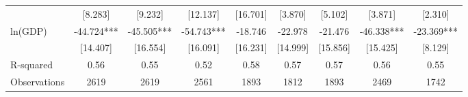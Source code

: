 \begin{table}[htbp]
{\begin{tabular}{l*{8}{c}}
                    &     [8.283]   &     [9.232]   &    [12.137]   &    [16.701]   &     [3.870]   &     [5.102]   &     [3.871]   &     [2.310]   \\
ln(GDP)             &     -44.724***&     -45.505***&     -54.743***&     -18.746   &     -22.978   &     -21.476   &     -46.338***&     -23.369***\\
                    &    [14.407]   &    [16.554]   &    [16.091]   &    [16.231]   &    [14.999]   &    [15.856]   &    [15.425]   &     [8.129]   \\
\midrule
R-squared           &        0.56   &        0.55   &        0.52   &        0.58   &        0.57   &        0.57   &        0.56   &        0.55   \\
Observations        &        2619   &        2619   &        2561   &        1893   &        1812   &        1893   &        2469   &        1742   \\
\bottomrule 
\end{tabular}}\end{table}
